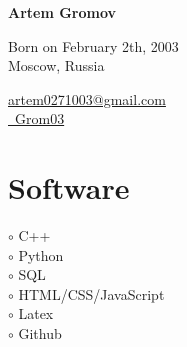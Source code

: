 \documentclass[a4paper,10pt]{article}
\newcommand{\MySkip}{
\vskip12pt
}
\newcommand{\myhref}[2]{%
\href{#1}{\textcolor{ColorTwo}{#2}}
}
\begin{document}
\thispagestyle{empty}

\begin{adjustbox}{valign=t}
\begin{minipage}{0.3\textwidth}
\begin{center}

\MySkip

{\LARGE \bfseries Artem Gromov}

\MySkip

Born on February 2th, 2003\\
Moscow, Russia \\

\MySkip

\textcolor{ColorTwo}{\faEnvelopeO} 
\myhref{mailto:artem0271003@gmail.com}{artem0271003@gmail.com} \\

\textcolor{ColorTwo}{\faChain} 
\myhref{https://github.com/Grom03}{\github \ Grom03}
\end{center}

\vfill

\section*{Software}
\raggedright
\textcolor{ColorOne}{$\circ$} C++\\
\textcolor{ColorOne}{$\circ$} Python\\
\textcolor{ColorOne}{$\circ$} SQL \\
\textcolor{ColorOne}{$\circ$} HTML/CSS/JavaScript \\
\textcolor{ColorOne}{$\circ$} Latex \\
\textcolor{ColorOne}{$\circ$} Github


\end{minipage}
\end{adjustbox}
\end{document}
